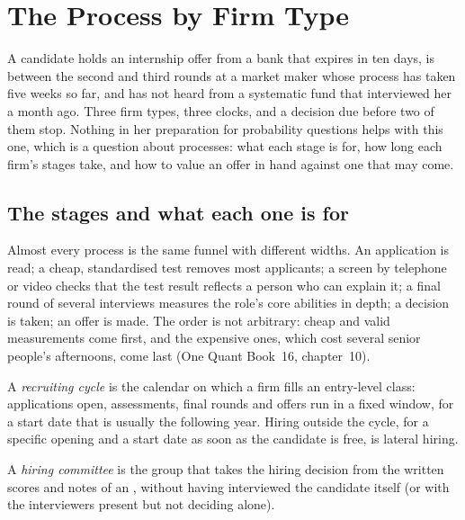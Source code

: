 \chapter{The Process by Firm Type}\label{ch:iv:the-process-by-firm-type}

A candidate holds an internship offer from a bank that expires in ten days, is between the second and third
rounds at a market maker whose process has taken five weeks so far, and has not heard from a systematic fund
that interviewed her a month ago. Three firm types, three clocks, and a decision due before two of them stop.
Nothing in her preparation for probability questions helps with this one, which is a question about
processes: what each stage is for, how long each firm's stages take, and how to value an offer in hand
against one that may come.

\section{The stages and what each one is for}

Almost every process is the same funnel with different widths. An application is read; a cheap, standardised
test removes most applicants; a screen by telephone or video checks that the test result reflects a person
who can explain it; a final round of several interviews measures the role's core abilities in depth; a
decision is taken; an offer is made. The order is not arbitrary: cheap and valid measurements come first, and
the expensive ones, which cost several senior people's afternoons, come last (One Quant Book~16, chapter~10).

\begin{definition}\label{def:iv:the-process-by-firm-type:cycle}
A \emph{recruiting cycle} is the calendar on which a firm fills an entry-level class:
applications open, assessments, final rounds and offers run in a fixed window, for a start date that is
usually the following year. Hiring outside the cycle, for a specific opening and a start date as soon as the
candidate is free, is lateral hiring.
\end{definition}

\begin{definition}\label{def:iv:the-process-by-firm-type:committee}
A \emph{hiring committee} is the group that takes the hiring decision from the written
scores and notes of an , without having interviewed the candidate itself (or with the
interviewers present but not deciding alone).
\end{definition}

